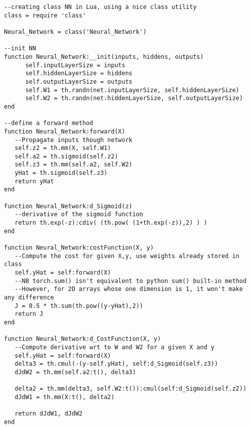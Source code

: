 \begin{lstlisting}[language={[5.2]Lua}]
--creating class NN in Lua, using a nice class utility
class = require 'class'

Neural_Network = class('Neural_Network')

--init NN
function Neural_Network:__init(inputs, hiddens, outputs)
      self.inputLayerSize = inputs
      self.hiddenLayerSize = hiddens
      self.outputLayerSize = outputs
      self.W1 = th.randn(net.inputLayerSize, self.hiddenLayerSize)
      self.W2 = th.randn(net.hiddenLayerSize, self.outputLayerSize)
end

--define a forward method
function Neural_Network:forward(X)
   --Propagate inputs though network
   self.z2 = th.mm(X, self.W1)
   self.a2 = th.sigmoid(self.z2)
   self.z3 = th.mm(self.a2, self.W2)
   yHat = th.sigmoid(self.z3)
   return yHat
end

function Neural_Network:d_Sigmoid(z)
   --derivative of the sigmoid function
   return th.exp(-z):cdiv( (th.pow( (1+th.exp(-z)),2) ) )
end

function Neural_Network:costFunction(X, y)
   --Compute the cost for given X,y, use weights already stored in class
   self.yHat = self:forward(X)
   --NB torch.sum() isn't equivalent to python sum() built-in method
   --However, for 2D arrays whose one dimension is 1, it won't make any difference
   J = 0.5 * th.sum(th.pow((y-yHat),2))
   return J
end

function Neural_Network:d_CostFunction(X, y)
   --Compute derivative wrt to W and W2 for a given X and y
   self.yHat = self:forward(X)
   delta3 = th.cmul(-(y-self.yHat), self:d_Sigmoid(self.z3))
   dJdW2 = th.mm(self.a2:t(), delta3)

   delta2 = th.mm(delta3, self.W2:t()):cmul(self:d_Sigmoid(self.z2))
   dJdW1 = th.mm(X:t(), delta2)

   return dJdW1, dJdW2
end

\end{lstlisting}

